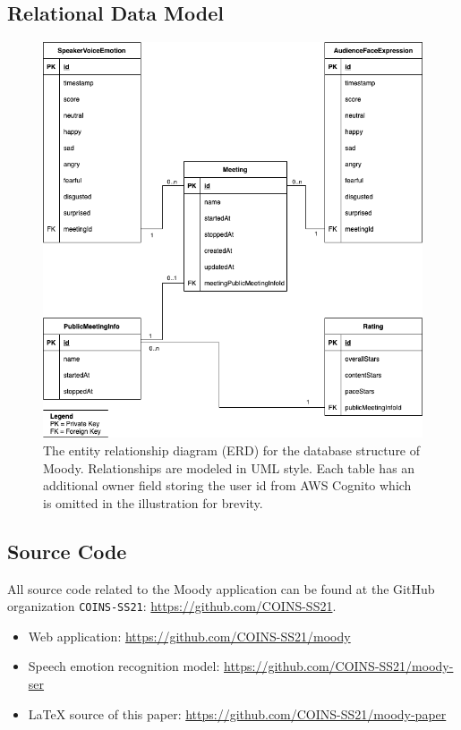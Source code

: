 \subsection*{Relational Data Model}
\label{app:appendix_relational_data_model}
\begin{figure}[ht]
\label{fig:erd}
\centering
\includegraphics[width=1\textwidth]{assets/erd.png}
\caption{The entity relationship diagram (ERD) for the database structure of Moody. Relationships are modeled in UML style. Each table has an additional owner field  storing the user id from AWS Cognito which is omitted in the illustration for brevity.}
\end{figure}

\subsection*{Source Code}
\label{app:appendix_source_code}
All source code related to the Moody application can be found at the GitHub organization \texttt{COINS-SS21}: \url{https://github.com/COINS-SS21}.

\begin{itemize}
    \item Web application: \url{https://github.com/COINS-SS21/moody}
    \item Speech emotion recognition model: \url{https://github.com/COINS-SS21/moody-ser}
    \item \LaTeX{} source of this paper: \url{https://github.com/COINS-SS21/moody-paper}
\end{itemize}
